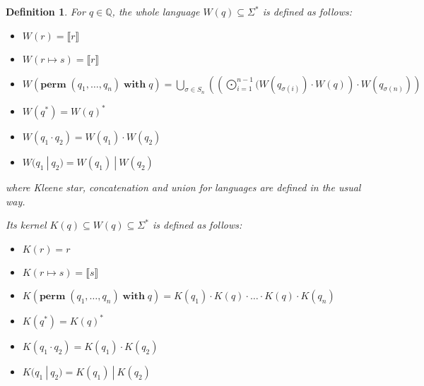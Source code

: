 \documentclass[a4paper,11pt] {article}
\theoremstyle{plain}
\newtheorem{definition}[theorem]{Definition}
\newcommand{\perm}{ \textbf{perm}\; }
\newcommand{\with}{ \;\textbf{with}\; }
\begin{document}
\begin{definition}
  For $q \in \mathbb{Q}$, the whole language $W(q) \subseteq \Sigma^*$
  is defined as follows:
  \begin{itemize}
  \item $W(r) = \llbracket r \rrbracket$
  \item $W(r \mapsto s) = \llbracket r \rrbracket$
  \item $W(\perm(q_1, \ldots, q_n) \with q) =
    \bigcup_{\sigma \in S_n} \left( \left(\bigodot_{i=1}^{n-1} (W(q_{\sigma(i)})
    \cdot W(q) \right)
    \cdot W(q_{\sigma(n)}) \right)$
  \item $W(q^*) = {W(q)}^*$
  \item $W(q_1 \cdot q_2) = W(q_1) \cdot W(q_2)$
  \item $W(q_1 ~|~ q_2) = W(q_1) ~|~ W(q_2)$
  \end{itemize}
  where Kleene star, concatenation and union for languages are defined
  in the usual way.
  
  Its kernel $K(q) \subseteq W(q) \subseteq \Sigma^*$ is defined as follows:
  \begin{itemize}
  \item $K(r) = r$
  \item $K(r \mapsto s) = \llbracket s \rrbracket$
  \item $K(\perm (q_1, \ldots, q_n) \with q) =
    K(q_1) \cdot K(q) \cdot \ldots \cdot
    K(q) \cdot K(q_n)$  
  \item $K(q^*) = {K(q)}^*$
  \item $K(q_1 \cdot q_2) = K(q_1) \cdot K(q_2)$
  \item $K(q_1 ~|~ q_2) = K(q_1) ~|~ K(q_2)$
  \end{itemize}
  
\end{definition}
\end{document}
